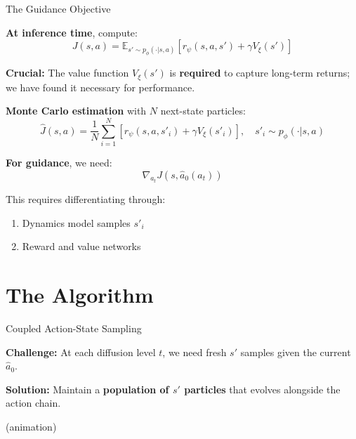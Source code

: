 \documentclass[aspectratio=169]{beamer}
\begin{document}
\begin{frame}{The Guidance Objective}

\textbf{At inference time}, compute:
\[
J(s, a) = \mathbb{E}_{s' \sim p_\phi(\cdot|s,a)}\left[ r_\psi(s, a, s') + \gamma V_\xi(s') \right]
\]

\textbf{Crucial:} The value function $V_\xi(s')$ is \textbf{required} to capture long-term returns; we have found it necessary for performance.

\vspace{0.5em}
\textbf{Monte Carlo estimation} with $N$ next-state particles:
\[
\hat{J}(s, a) = \frac{1}{N} \sum_{i=1}^{N} \left[ r_\psi(s, a, s'_i) + \gamma V_\xi(s'_i) \right], \quad s'_i \sim p_\phi(\cdot|s,a)
\]

\vspace{0.5em}
\textbf{For guidance}, we need:
\[
\nabla_{a_t} J(s, \hat{a}_0(a_t))
\]

This requires differentiating through:
\begin{enumerate}
    \item Dynamics model samples $s'_i$
    \item Reward and value networks
\end{enumerate}

\end{frame}

\section{The Algorithm}

\begin{frame}{Coupled Action-State Sampling}

\textbf{Challenge:} At each diffusion level $t$, we need fresh $s'$ samples given the current $\hat{a}_0$.

\vspace{0.5em}
\textbf{Solution:} Maintain a \textbf{population of $s'$ particles} that evolves alongside the action chain.

\vspace{0.8em}
\begin{center}
(animation)
\end{center}

\end{frame}
\end{document}
